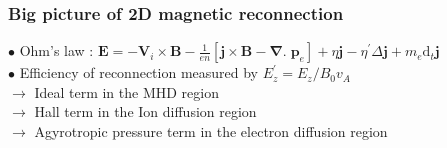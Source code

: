 \documentclass{beamer}
\newcommand{\D}{{\mathrm d}}
\begin{document}
\begin{frame}
\frametitle{Big picture of 2D magnetic reconnection}

\begin{center}

\end{center}

$\bullet$ Ohm's law : $\displaystyle \mathbf E = - \mathbf V_i \times \mathbf B - \frac{1}{en} [\mathbf j \times \mathbf B - \boldsymbol{\nabla} . \; \mathbf p_e] + \eta \mathbf j - \eta^{\prime} \Delta \mathbf j + m_e \D _t \mathbf j$ \\[0.2cm]
$\bullet$ Efficiency  of reconnection measured by $E_z^{\prime} = E_z/B_0 v_A$ \\[0.1cm]
$\to$ Ideal term in the MHD region \\
$\to$ Hall term in the Ion diffusion region \\
$\to$ Agyrotropic pressure term in the electron diffusion region \\

\end{frame}
\end{document}
